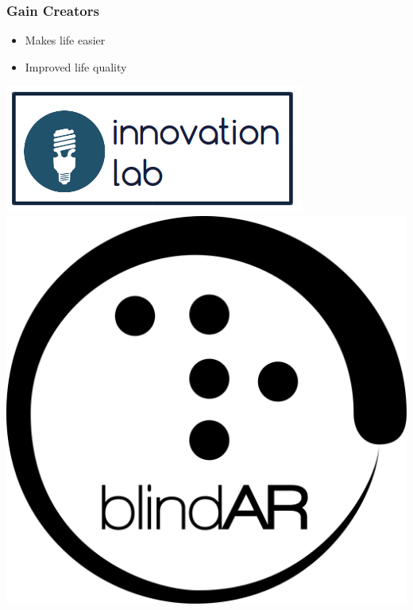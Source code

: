 \begin{frame}
	\frametitle{Gain Creators}
	\begin{itemize}
		\item
			Makes life easier
		\item
			Improved life quality
	\end{itemize}
\end{frame}

\logo{}
  { %
		\begin{frame}[noframenumbering]{}

			\vspace{1.5cm}
			\centering
	\vspace{1cm}

	\includegraphics[height=0.3\textheight]{innolab2.png}
	\hspace{1cm}
	\includegraphics[height=0.3\textheight]{themefau/art/logo_bold.pdf}

    \end{frame}
  }

